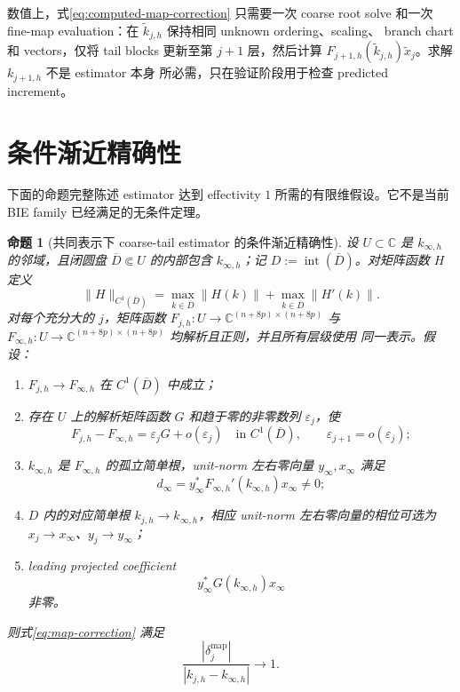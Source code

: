 \documentclass[UTF8,fontset=fandol,11pt,a4paper]{ctexart}
\newtheorem{proposition}{命题}
\begin{document}
数值上，式\eqref{eq:computed-map-correction} 只需要一次 coarse root solve 和一次
fine-map evaluation：在 $\widetilde k_{j,h}$ 保持相同 unknown ordering、scaling、
branch chart 和 vectors，仅将 tail blocks 更新至第 $j+1$ 层，然后计算
$F_{j+1,h}(\widetilde k_{j,h})\widetilde x_j$。求解 $k_{j+1,h}$ 不是 estimator 本身
所必需，只在验证阶段用于检查 predicted increment。

\section{条件渐近精确性}

下面的命题完整陈述 estimator 达到 effectivity $1$ 所需的有限维假设。它不是当前
BIE family 已经满足的无条件定理。

\begin{proposition}[共同表示下 coarse-tail estimator 的条件渐近精确性]
设 $U\subset\mathbb C$ 是 $k_{\infty,h}$ 的邻域，且闭圆盘
$\overline D\Subset U$ 的内部包含 $k_{\infty,h}$；记
$D:=\operatorname{int}(\overline D)$。对矩阵函数 $H$ 定义
\[
  \|H\|_{C^1(\overline D)}
  =\max_{k\in\overline D}\|H(k)\|
   +\max_{k\in\overline D}\|H'(k)\|.
\]
对每个充分大的 $j$，矩阵函数
$F_{j,h}:U\to\mathbb C^{(n+8p)\times(n+8p)}$ 与
$F_{\infty,h}:U\to\mathbb C^{(n+8p)\times(n+8p)}$ 均解析且正则，并且所有层级使用
同一表示。假设：
\begin{enumerate}
  \item $F_{j,h}\to F_{\infty,h}$ 在 $C^1(\overline D)$ 中成立；
  \item 存在 $U$ 上的解析矩阵函数 $G$ 和趋于零的非零数列 $\varepsilon_j$，使
  \[
    F_{j,h}-F_{\infty,h}
    =\varepsilon_jG+o(\varepsilon_j)
    \quad\text{in }C^1(\overline D),
    \qquad
    \varepsilon_{j+1}=o(\varepsilon_j);
  \]
  \item $k_{\infty,h}$ 是 $F_{\infty,h}$ 的孤立简单根，unit-norm 左右零向量
  $y_\infty,x_\infty$ 满足
  \[
    d_\infty
    =y_\infty^*F_{\infty,h}'(k_{\infty,h})x_\infty\ne0;
  \]
  \item $D$ 内的对应简单根 $k_{j,h}\to k_{\infty,h}$，相应 unit-norm 左右零向量的相位可选为
  $x_j\to x_\infty$、$y_j\to y_\infty$；
  \item leading projected coefficient
  \[
    y_\infty^*G(k_{\infty,h})x_\infty
  \]
  非零。
\end{enumerate}
则式\eqref{eq:map-correction} 满足
\[
  \frac{|\delta_j^{\mathrm{map}}|}
       {|k_{j,h}-k_{\infty,h}|}
  \longrightarrow1.
\]
\end{proposition}
\end{document}

